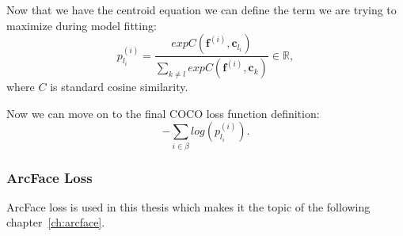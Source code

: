 Now that we have the centroid equation we can define the term we are trying to maximize during model fitting:
\begin{equation}
    p_{l_i}^{(i)} = \frac{exp C(\boldsymbol{f}^{(i)}, \boldsymbol{c}_{l_{i}})}
    {\sum_{k \neq l} exp C(\boldsymbol{f}^{(i)}, \boldsymbol{c}_{k})} \in \mathbb{R},
\end{equation}
where $C$ is standard cosine similarity.

Now we can move on to the final COCO loss function definition:
\begin{equation}
    - \sum_{i \in \beta} log \left( p_{l_i}^{(i)} \right).
\end{equation}


\subsubsection{ArcFace Loss}\label{subsubsec:arcface}
ArcFace loss is used in this thesis which makes it the topic of the following chapter~\ref{ch:arcface}.